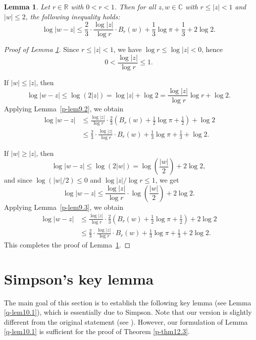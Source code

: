 \documentclass[12pt,twoside]{amsart}
\newtheorem{lem}[thm]{Lemma}
\theoremstyle{definition}
\begin{document}
\begin{lem}
\label{p-lem9.4}
Let $r \in \mathbb R$ with $0 < r < 1$. Then for all 
$z, w \in \mathbb C$ with $r \le |z| < 1$ and 
$|w| \le 2$, the following inequality holds:
\[
\log |w - z|
\le
\frac{2}{3} \cdot \frac{\log |z|}{\log r} \cdot B_r(w)
+ \frac{1}{3} \log \pi + \frac{1}{3} + 2 \log 2.
\]
\end{lem}

\begin{proof}[Proof of Lemma \ref{p-lem9.4}]
Since $r \le |z| < 1$, we have $\log r \le \log |z| < 0$, 
hence \[0 < \frac{\log |z|}{\log r} \le 1.\]

If $|w| \le |z|$, then
\[
\log |w - z| \le \log(2|z|) = \log |z| + \log 2 
= \frac{\log |z|}{\log r} \log r + \log 2.
\]
Applying Lemma~\ref{p-lem9.2}, we obtain
\begin{align*}
\log |w - z|
&\le
\frac{\log |z|}{\log r} \cdot \frac{2}{3} \left( B_r(w) 
+ \frac{1}{2} \log \pi + \frac{1}{2} \right) + \log 2 \\
& \leq  
\frac{2}{3} \cdot \frac{\log |z|}{\log r} \cdot B_r(w)
+ \frac{1}{3} \log \pi + \frac{1}{3} + \log 2.
\end{align*}

If $|w| \ge |z|$, then
\[
\log |w - z| \le \log(2|w|) = \log 
\left( \frac{|w|}{2} \right) + 2 \log 2,
\]
and since $\log(|w|/2) \le 0$ and $\log |z|/\log r \le 1$, we get
\[
\log |w - z| \le \frac{\log |z|}{\log r} 
\cdot \log \left( \frac{|w|}{2} \right) + 2 \log 2.
\]
Applying Lemma~\ref{p-lem9.3}, we obtain
\begin{align*}
\log |w - z|
&\le
\frac{\log |z|}{\log r} \cdot \frac{2}{3} 
\left( B_r(w) + \frac{1}{2} \log \pi + \frac{1}{2} \right) + 2 \log 2 \\
& \leq 
\frac{2}{3} \cdot \frac{\log |z|}{\log r} \cdot B_r(w)
+ \frac{1}{3} \log \pi + \frac{1}{3} + 2 \log 2.
\end{align*}
This completes the proof of Lemma~\ref{p-lem9.4}.
\end{proof}

\section{Simpson's key lemma}\label{q-sec10}

The main goal of this section is to establish the following key lemma (see 
Lemma \ref{q-lem10.1}), which is essentially due to Simpson.  
Note that our version is slightly different from 
the original statement (see \cite[Lemma 10.2]{simpson1}).  
However, our formulation of Lemma \ref{q-lem10.1} is sufficient 
for the proof of Theorem \ref{p-thm12.3}.
\end{document}
